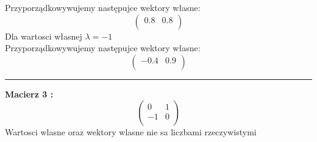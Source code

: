 \documentclass[10pt,a4paper]{article}
\begin{document}
Przyporz\k{a}dkowywujemy nast\k{e}pujce wektory w\l{}asne: \
$$ \begin{pmatrix}  0.8 & 0.8 \\ \end{pmatrix}$$
Dla wartosci w\l{}asnej  $\lambda =  -1 $ \\
Przyporz\k{a}dkowywujemy nast\k{e}pujce wektory w\l{}asne: \
$$ \begin{pmatrix}  -0.4 & 0.9 \\ \end{pmatrix}$$
\noindent\rule[0.5cm]{\textwidth}{1pt}
\textbf{Macierz  3 :}\\
$$\begin{pmatrix} 0 & 1 \\ -1 & 0 \\ \end{pmatrix}$$
Wartosci wlasne oraz wektory wlasne nie sa liczbami rzeczywistymi
\end{document}
